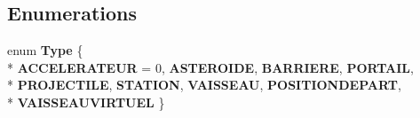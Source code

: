 \subsection*{Enumerations}
\begin{DoxyCompactItemize}
\item 
enum {\bfseries Type} \{ \\*
{\bfseries A\-C\-C\-E\-L\-E\-R\-A\-T\-E\-U\-R} = 0, 
{\bfseries A\-S\-T\-E\-R\-O\-I\-D\-E}, 
{\bfseries B\-A\-R\-R\-I\-E\-R\-E}, 
{\bfseries P\-O\-R\-T\-A\-I\-L}, 
\\*
{\bfseries P\-R\-O\-J\-E\-C\-T\-I\-L\-E}, 
{\bfseries S\-T\-A\-T\-I\-O\-N}, 
{\bfseries V\-A\-I\-S\-S\-E\-A\-U}, 
{\bfseries P\-O\-S\-I\-T\-I\-O\-N\-D\-E\-P\-A\-R\-T}, 
\\*
{\bfseries V\-A\-I\-S\-S\-E\-A\-U\-V\-I\-R\-T\-U\-E\-L}
 \}
\end{DoxyCompactItemize}
